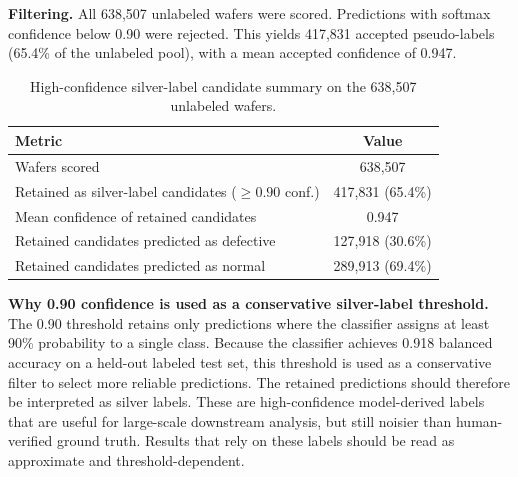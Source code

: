 \documentclass[11pt]{article}
\begin{document}
\textbf{Filtering.} All 638,507 unlabeled wafers were scored. Predictions with softmax confidence below 0.90 were rejected. This yields 417,831 accepted pseudo-labels (65.4\% of the unlabeled pool), with a mean accepted confidence of 0.947.

\begin{table}[H]
\centering
\caption{High-confidence silver-label candidate summary on the 638,507 unlabeled wafers.}
\label{tab:pseudolabel_summary}
\begin{tabular}{lc}
\toprule
Metric & Value \\
\midrule
Wafers scored & 638{,}507 \\
Retained as silver-label candidates ($\geq 0.90$ conf.) & 417{,}831 (65.4\%) \\
Mean confidence of retained candidates & 0.947 \\
Retained candidates predicted as defective & 127{,}918 (30.6\%) \\
Retained candidates predicted as normal & 289{,}913 (69.4\%) \\
\bottomrule
\end{tabular}
\end{table}

\textbf{Why 0.90 confidence is used as a conservative silver-label threshold.} The 0.90 threshold retains only predictions where the classifier assigns at least 90\% probability to a single class. Because the classifier achieves 0.918 balanced accuracy on a held-out labeled test set, this threshold is used as a conservative filter to select more reliable predictions. The retained predictions should therefore be interpreted as silver labels. These are high-confidence model-derived labels that are useful for large-scale downstream analysis, but still noisier than human-verified ground truth. Results that rely on these labels should be read as approximate and threshold-dependent.
\end{document}
